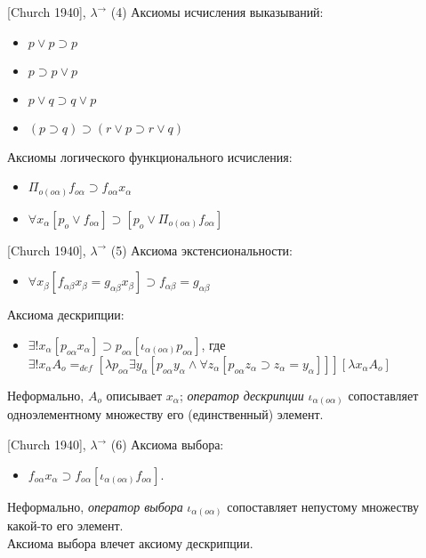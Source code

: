 \documentclass{beamer}
\begin{document}
\begin{frame}{[Church 1940], $\lambda^\to$ (4)}
Аксиомы исчисления выказываний:\\
\begin{itemize}
  \item $p \vee p \supset p$
  \item $p \supset p \vee p$
  \item $p \vee q \supset q \vee p$
  \item $(p \supset q) \supset (r \vee p \supset r \vee q)$
\end{itemize}
\bigskip
Аксиомы логического функционального исчисления:\\
\begin{itemize}
  \item $\Pi_{o (o \alpha)} f_{o \alpha} \supset f_{o \alpha} x_\alpha$
  \item $\forall x_\alpha [p_o \vee f_{o \alpha}] \supset [p_o \vee \Pi_{o(o \alpha)} f_{o \alpha}]$
\end{itemize}
\end{frame}

\begin{frame}{[Church 1940], $\lambda^\to$ (5)}
Аксиома экстенсиональности:\\
\bigskip
\begin{itemize}
  \item $\forall x_\beta [f_{\alpha \beta} x_\beta = g_{\alpha \beta} x_\beta] \supset f_{\alpha \beta} = g_{\alpha \beta}$
\end{itemize}
\bigskip
Аксиома дескрипции:\\
\begin{itemize}
  \item $\exists ! x_\alpha [p_{o \alpha} x_\alpha] \supset p_{o \alpha} [\iota_{\alpha(o \alpha)}p_{o \alpha}]$, где $\exists ! x_\alpha A_o =_{def} [\lambda p_{o \alpha} \exists y_\alpha[p_{o \alpha} y_\alpha \wedge \forall z_\alpha[p_{o \alpha} z_\alpha \supset z_\alpha = y_\alpha]]][\lambda x_\alpha A_o]$
\end{itemize}
\bigskip
Неформально, $A_o$ описывает $x_\alpha$; \textit{оператор дескрипции} $\iota_{\alpha (o \alpha)}$ сопоставляет одноэлементному множеству его (единственный) элемент.
\end{frame}

\begin{frame}{[Church 1940], $\lambda^\to$ (6)}
Аксиома выбора:\\
\bigskip
\begin{itemize}
  \item $f_{o \alpha} x_\alpha \supset f_{o \alpha} [\iota_{\alpha (o \alpha)} f_{o \alpha}].$
\end{itemize}
\bigskip
Неформально, \textit{оператор выбора} $\iota_{\alpha (o \alpha)}$ сопоставляет непустому множеству какой-то его элемент.\\
\bigskip
Аксиома выбора влечет аксиому дескрипции.
\end{frame}
\end{document}
